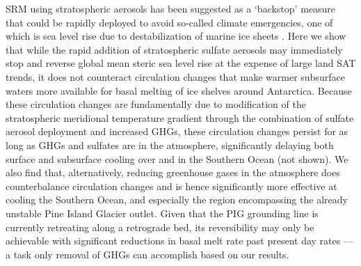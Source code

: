 \documentclass[grl]{AGUTeX}  %
\begin{document}
\begin{article}
SRM using stratospheric aerosols has been suggested as a `backstop' measure that could be rapidly deployed to avoid so-called climate emergencies, one of which is sea level rise due to destabilization of marine ice sheets \citep{blackstock09}. Here we show that while the rapid addition of stratospheric sulfate aerosols may immediately stop and reverse global mean steric sea level rise at the expense of large land SAT trends, it does not counteract circulation changes that make warmer subsurface waters more available for basal melting of ice shelves around Antarctica. Because these circulation changes are fundamentally due to modification of the stratospheric meridional temperature gradient through the combination of sulfate aerosol deployment and increased GHGs, these circulation changes persist for as long as GHGs and sulfates are in the atmosphere, significantly delaying both surface and subsurface cooling over and in the Southern Ocean (not shown). We also find that, alternatively, reducing greenhouse gases in the atmosphere does counterbalance circulation changes and is hence significantly more effective at cooling the Southern Ocean, and especially the region encompassing the already unstable Pine Island Glacier outlet. Given that the PIG grounding line is currently retreating along a retrograde bed, its reversibility may only be achievable with significant reductions in basal melt rate past present day rates \citep{favier14} --- a task only removal of GHGs can accomplish based on our results.


\end{article}
\end{document}
